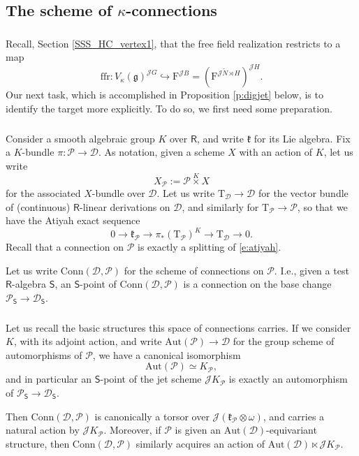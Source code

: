 \documentclass{amsart}
\theoremstyle{definition}
\newcommand{\fk}{\mathfrak{k}}
\newcommand{\diglet}{\mathrm{F}}
\newcommand{\sss}{\subsubsection{}}
\newcommand{\fg}{\mathfrak{g}}
\newcommand{\sD}{\mathscr{D}}
\newcommand{\Sing}{\mathsf{S}}
\newcommand{\on}{\mathrm}
\newcommand{\Ring}{\mathsf{R}}
\newcommand{\ffr}{\mathrm{ffr}}
\newcommand{\sP}{\mathscr{P}}
\newcommand{\Jet}{\mathscr{J}}
\newcommand{\Conn}{\on{Conn}}
\newcommand{\Aut}{\on{Aut}}
\numberwithin{equation}{section}
\begin{document}
\subsection{The scheme of $\kappa$-connections} 
\label{ss:kconnections}
\sss Recall, Section \ref{SSS_HC_vertex1}, that the free field realization restricts to a map $$\ffr: V_\kappa(\fg)^{\Jet G} \hookrightarrow \diglet^{\Jet B} = (\diglet^{\Jet \tilde{N} \rtimes H})^{\Jet H}.$$
Our next task, which is accomplished in Proposition \ref{p:digjet} below, is to identify the target more explicitly. To do so, we first need some preparation. 

\sss Consider a smooth algebraic group $K$ over $\Ring$, and write $\fk$ for its Lie algebra.  Fix a $K$-bundle $\pi: \sP \rightarrow \sD$. As notation, given a scheme $X$ with an action of $K$, let us write $$X_\sP := \sP \overset{K} \times X$$for the associated $X$-bundle over $\sD$. Let us write $\on{T}_\sD \rightarrow \sD$ for the vector bundle of (continuous) $\Ring$-linear derivations on $\sD$, and similarly for $\on{T}_\sP \rightarrow \sP$, so that we have the Atiyah exact sequence 
\begin{equation} \label{e:atiyah} 0 \rightarrow \fk_\sP \rightarrow \pi_*(\on{T}_\sP)^K \rightarrow \on{T}_\sD \rightarrow 0.\end{equation}
Recall that a connection on $\sP$ is exactly a splitting of \eqref{e:atiyah}. 


Let us write $\Conn(\sD, \sP)$ for the scheme of connections on $\sP$. I.e., given a test $\Ring$-algebra $\Sing$, an $\Sing$-point of $\Conn(\sD, \sP)$ is a connection on the base change $\sP_\Sing \rightarrow \sD_\Sing$. 

\sss Let us recall the basic structures this space of connections carries. If we consider $K$, with its adjoint action, and write $\on{Aut}(\sP) \rightarrow \sD$ for the group scheme of automorphisms of $\sP$, we have a canonical isomorphism $$\on{Aut}(\sP) \simeq K_{\sP},$$
and in particular an $\Sing$-point of the jet scheme $\Jet K_\sP$ is exactly an automorphism of $\sP_\Sing \rightarrow \sD_\Sing$. 

Then $\Conn(\sD, \sP)$ is canonically a torsor over $\Jet (\fk_\sP \otimes \omega)$, and carries a natural action by $\Jet K_\sP$. Moreover, if $\sP$ is given an $\Aut(\sD)$-equivariant structure, then $\Conn(\sD, \sP)$ similarly acquires an action of $\Aut(\sD) \ltimes \Jet K_\sP$. 
\end{document}
